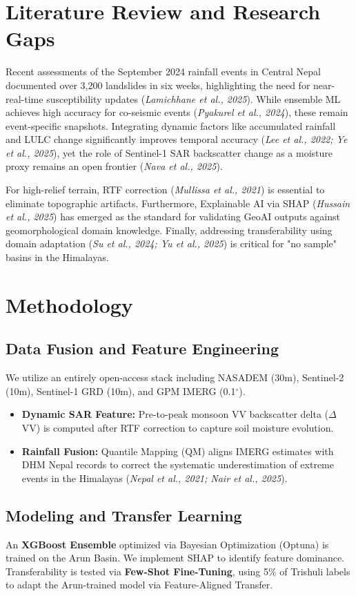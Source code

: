 \documentclass[11pt,a4paper]{article}
\begin{document}
\section{Literature Review and Research Gaps}
Recent assessments of the September 2024 rainfall events in Central Nepal documented over 3,200 landslides in six weeks, highlighting the need for near-real-time susceptibility updates (\textit{Lamichhane et al., 2025}). While ensemble ML achieves high accuracy for co-seismic events (\textit{Pyakurel et al., 2024}), these remain event-specific snapshots. Integrating dynamic factors like accumulated rainfall and LULC change significantly improves temporal accuracy (\textit{Lee et al., 2022; Ye et al., 2025}), yet the role of Sentinel-1 SAR backscatter change as a moisture proxy remains an open frontier (\textit{Nava et al., 2025}).

For high-relief terrain, RTF correction (\textit{Mullissa et al., 2021}) is essential to eliminate topographic artifacts. Furthermore, Explainable AI via SHAP (\textit{Hussain et al., 2025}) has emerged as the standard for validating GeoAI outputs against geomorphological domain knowledge. Finally, addressing transferability using domain adaptation (\textit{Su et al., 2024; Yu et al., 2025}) is critical for "no sample" basins in the Himalayas.

\section{Methodology}
\subsection{Data Fusion and Feature Engineering}
We utilize an entirely open-access stack including NASADEM (30m), Sentinel-2 (10m), Sentinel-1 GRD (10m), and GPM IMERG (0.1$^\circ$).
\begin{itemize}
    \item \textbf{Dynamic SAR Feature:} Pre-to-peak monsoon VV backscatter delta ($\Delta$VV) is computed after RTF correction to capture soil moisture evolution.
    \item \textbf{Rainfall Fusion:} Quantile Mapping (QM) aligns IMERG estimates with DHM Nepal records to correct the systematic underestimation of extreme events in the Himalayas (\textit{Nepal et al., 2021; Nair et al., 2025}).
\end{itemize}

\subsection{Modeling and Transfer Learning}
An \textbf{XGBoost Ensemble} optimized via Bayesian Optimization (Optuna) is trained on the Arun Basin. We implement SHAP to identify feature dominance. Transferability is tested via \textbf{Few-Shot Fine-Tuning}, using 5\% of Trishuli labels to adapt the Arun-trained model via Feature-Aligned Transfer.
\end{document}
